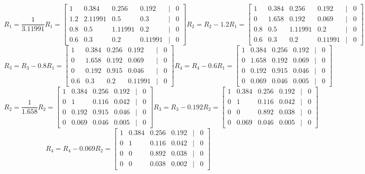 \documentclass[a3paper,12pt]{extarticle} %
\begin{document}
\begin{enumerate}
\begin{enumerate}
\[        \]
        \[
        R_1 = \frac{1}{3.11991}R_1 = \begin{bmatrix}1 & 0.384 & 0.256 & 0.192 & | & 0\\1.2 & 2.11991 & 0.5 & 0.3 & | & 0\\0.8 & 0.5 & 1.11991 & 0.2 & | & 0\\0.6 & 0.3 & 0.2 & 0.11991 & | & 0\end{bmatrix}
        R_2 = R_2 - 1.2R_1 = \begin{bmatrix}1 & 0.384 & 0.256 & 0.192 & | & 0\\0 & 1.658 & 0.192 & 0.069 & | & 0\\0.8 & 0.5 & 1.11991 & 0.2 & | & 0\\0.6 & 0.3 & 0.2 & 0.11991 & | & 0\end{bmatrix}
        \]
        \[
        R_3 = R_3 - 0.8R_1 = \begin{bmatrix}1 & 0.384 & 0.256 & 0.192 & | & 0\\0 & 1.658 & 0.192 & 0.069 & | & 0\\0 & 0.192 & 0.915 & 0.046 & | & 0\\0.6 & 0.3 & 0.2 & 0.11991 & | & 0\end{bmatrix}
        R_4 = R_4 - 0.6R_1 = \begin{bmatrix}1 & 0.384 & 0.256 & 0.192 & | & 0\\0 & 1.658 & 0.192 & 0.069 & | & 0\\0 & 0.192 & 0.915 & 0.046 & | & 0\\0 & 0.069 & 0.046 & 0.005 & | & 0\end{bmatrix}
        \]
        \[
        R_2 = \frac{1}{1.658}R_2 = \begin{bmatrix}1 & 0.384 & 0.256 & 0.192 & | & 0\\0 & 1 & 0.116 & 0.042 & | & 0\\0 & 0.192 & 0.915 & 0.046 & | & 0\\0 & 0.069 & 0.046 & 0.005 & | & 0\end{bmatrix}
        R_3 = R_3 - 0.192R_2 = \begin{bmatrix}1 & 0.384 & 0.256 & 0.192 & | & 0\\0 & 1 & 0.116 & 0.042 & | & 0\\0 & 0 & 0.892 & 0.038 & | & 0\\0 & 0.069 & 0.046 & 0.005 & | & 0\end{bmatrix}
        \]
        \[
        R_4 = R_4 - 0.069R_2 = \begin{bmatrix}1 & 0.384 & 0.256 & 0.192 & | & 0\\0 & 1 & 0.116 & 0.042 & | & 0\\0 & 0 & 0.892 & 0.038 & | & 0\\0 & 0 & 0.038 & 0.002 & | & 0\end{bmatrix}
\]
\end{enumerate}
\end{enumerate}
\end{document}
